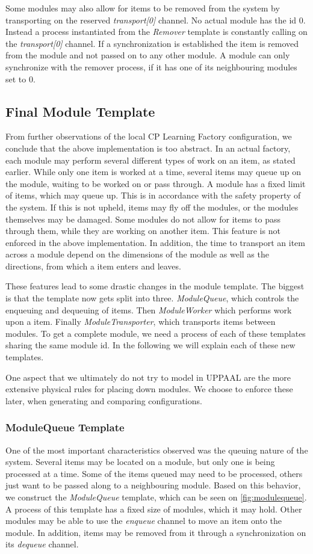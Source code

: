 Some modules may also allow for items to be removed from the system by transporting on the reserved \emph{transport[0]} channel. No actual module has the id 0. Instead a process instantiated from the \emph{Remover} template is constantly calling on the \emph{transport[0]} channel. If a synchronization is established the item is removed from the module and not passed on to any other module. A module can only synchronize with the remover process, if it has one of its neighbouring modules set to 0. 

\subsection{Final Module Template}
From further observations of the local CP Learning Factory configuration, we conclude that the above implementation is too abstract. In an actual factory, each module may perform several different types of work on an item, as stated earlier. While only one item is worked at a time, several items may queue up on the module, waiting to be worked on or pass through. A module has a fixed limit of items, which may queue up. This is in accordance with the safety property of the system. If this is not upheld, items may fly off the modules, or the modules themselves may be damaged. Some modules do not allow for items to pass through them, while they are working on another item. This feature is not enforced in the above implementation. In addition, the time to transport an item across a module depend on the dimensions of the module as well as the directions, from which a item enters and leaves.

These features lead to some drastic changes in the module template. The biggest is that the template now gets split into three. \emph{ModuleQueue}, which controls the enqueuing and dequeuing of items. Then \emph{ModuleWorker} which performs work upon a item. Finally \emph{ModuleTransporter}, which transports items between modules. To get a complete module, we need a process of each of these templates sharing the same module id. In the following we will explain each of these new templates.

One aspect that we ultimately do not try to model in UPPAAL are the more extensive physical rules for placing down modules. We choose to enforce these later, when generating and comparing configurations. 

\subsubsection{ModuleQueue Template}\label{subs:modulequeue}
One of the most important characteristics observed was the queuing nature of the system. Several items may be located on a module, but only one is being processed at a time. Some of the items queued may need to be processed, others just want to be passed along to a neighbouring module. Based on this behavior, we construct the \emph{ModuleQueue} template, which can be seen on \cref{fig:modulequeue}. A process of this template has a fixed size of modules, which it may hold. Other modules may be able to use the \emph{enqueue} channel to move an item onto the module. In addition, items may be removed from it through a synchronization on its \emph{dequeue} channel.


